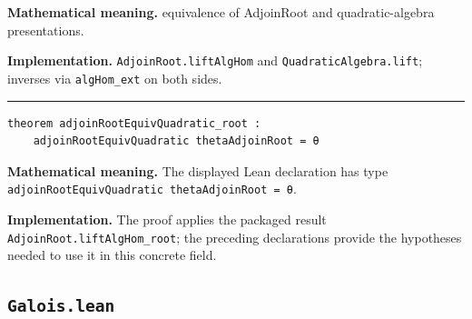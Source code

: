 \documentclass[UTF8,a4paper,11pt,fontset=fandol]{ctexart}
\theoremstyle{definition}
\newcommand{\statementsep}{\par\medskip\hrule\medskip}
\begin{document}
\noindent\textbf{Mathematical meaning.} equivalence of AdjoinRoot and quadratic-algebra presentations.\par
\noindent\textbf{Implementation.} \texttt{AdjoinRoot.\allowbreak{}liftAlgHom} and \texttt{QuadraticAlgebra.\allowbreak{}lift}; inverses via \texttt{algHom\_\allowbreak{}ext} on both sides.\par
\statementsep
\begin{verbatim}
theorem adjoinRootEquivQuadratic_root :
    adjoinRootEquivQuadratic thetaAdjoinRoot = θ
\end{verbatim}
\noindent\textbf{Mathematical meaning.} The displayed Lean declaration has type \texttt{adjoinRootEquivQuadratic thetaAdjoinRoot = θ}.\par
\noindent\textbf{Implementation.} The proof applies the packaged result \texttt{AdjoinRoot.\allowbreak{}liftAlgHom\_\allowbreak{}root}; the preceding declarations provide the hypotheses needed to use it in this concrete field.\par

\subsection{\texttt{Galois.lean}}
\end{document}
